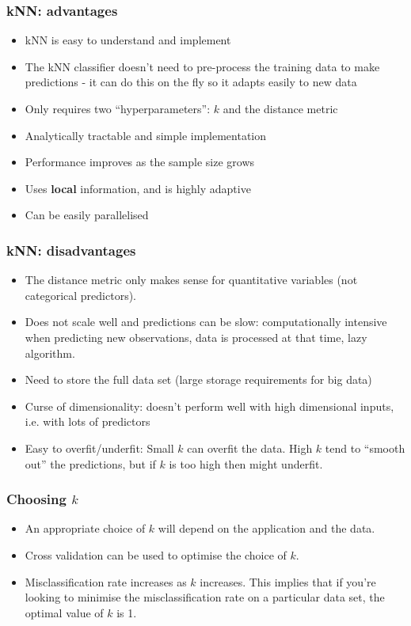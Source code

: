 \documentclass[a4paper]{article}\usepackage[]{graphicx}\usepackage[]{xcolor}
\begin{document}
\subsubsection{kNN: advantages}
\begin{itemize}
	\item kNN is easy to understand and implement
	\item The kNN classifier doesn't need to pre-process the training data to make predictions - it can do this on the fly so it adapts easily to new data
	\item Only requires two ``hyperparameters'': \( k \) and the distance metric
	\item Analytically tractable and simple implementation
	\item Performance improves as the sample size grows
	\item Uses \textbf{local} information, and is highly adaptive
	\item Can be easily parallelised
\end{itemize}
\subsubsection{kNN: disadvantages}
\begin{itemize}
	\item The distance metric only makes sense for quantitative variables (not categorical predictors).
	\item Does not scale well and predictions can be slow: computationally intensive when predicting new observations, data is processed at that time, lazy algorithm.
	\item Need to store the full data set (large storage requirements for big data)
	\item Curse of dimensionality: doesn't perform well with high dimensional inputs, i.e. with lots of predictors
	\item Easy to overfit/underfit: Small \( k \) can overfit the data. High \( k \) tend to ``smooth out'' the predictions, but if \( k \) is too high then might underfit.
\end{itemize}
\subsubsection{Choosing \( k \)}
\begin{itemize}
	\item An appropriate choice of \( k \) will depend on the application and the data.
	\item Cross validation can be used to optimise the choice of \( k \).
	\item Misclassification rate increases as \( k \) increases. This implies that if you’re looking to minimise the misclassification rate on a particular data set, the optimal value of \( k \) is 1.
\end{itemize}
\end{document}
